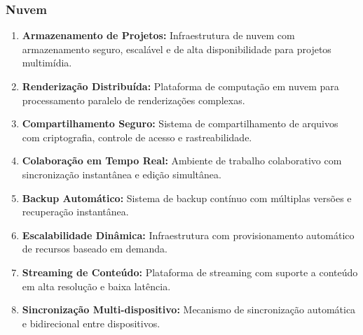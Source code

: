 \subsubsection{Nuvem}
\begin{enumerate}[leftmargin=*]
    \item \textbf{Armazenamento de Projetos:} Infraestrutura de nuvem com armazenamento seguro, escalável e de alta disponibilidade para projetos multimídia.
    \item \textbf{Renderização Distribuída:} Plataforma de computação em nuvem para processamento paralelo de renderizações complexas.
    \item \textbf{Compartilhamento Seguro:} Sistema de compartilhamento de arquivos com criptografia, controle de acesso e rastreabilidade.
    \item \textbf{Colaboração em Tempo Real:} Ambiente de trabalho colaborativo com sincronização instantânea e edição simultânea.
    \item \textbf{Backup Automático:} Sistema de backup contínuo com múltiplas versões e recuperação instantânea.
    \item \textbf{Escalabilidade Dinâmica:} Infraestrutura com provisionamento automático de recursos baseado em demanda.
    \item \textbf{Streaming de Conteúdo:} Plataforma de streaming com suporte a conteúdo em alta resolução e baixa latência.
    \item \textbf{Sincronização Multi-dispositivo:} Mecanismo de sincronização automática e bidirecional entre dispositivos.
\end{enumerate}

